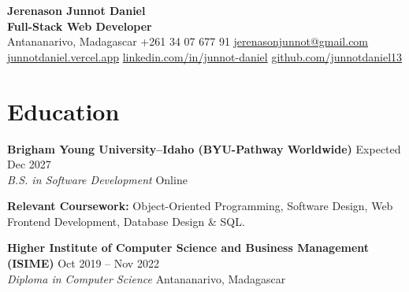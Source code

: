 \documentclass[10pt,a4paper]{article}
\newcommand{\entry}[4]{%
  {\bfseries #1} \hfill {\color{muted}#2}\\
  {\color{accent}\itshape #3} \hfill {\color{muted}\small #4}\par
  \vspace{1pt}}
\newcommand{\sep}{\hspace{4pt}{\color{muted}|}\hspace{4pt}}
\begin{document}
\vspace*{-6pt}
\begin{center}
  {\fontsize{22}{26}\selectfont\bfseries\color{accent}
    Jerenason Junnot Daniel}\\[3pt]
  {\large\bfseries\color{muted} Full-Stack Web Developer}\\[4pt]
  {\small
    Antananarivo, Madagascar\sep
    +261 34 07 677 91\sep
    \href{mailto:jerenasonjunnot@gmail.com}{jerenasonjunnot@gmail.com}\\[2pt]
    \href{https://junnotdaniel.vercel.app}{junnotdaniel.vercel.app}\sep
    \href{https://www.linkedin.com/in/junnot-daniel}{linkedin.com/in/junnot-daniel}\sep
    \href{https://github.com/junnotdaniel13}{github.com/junnotdaniel13}}
\end{center}
\vspace{-6pt}

\vfill


\section*{Education}
\entry{Brigham Young University--Idaho (BYU-Pathway Worldwide)}{Expected Dec 2027}%
{B.S. in Software Development}{Online}
{\small\color{muted}\textbf{Relevant Coursework:} Object-Oriented
Programming, Software Design, Web Frontend Development, Database Design \&
SQL.}\par
\vspace{5pt}

\entry{Higher Institute of Computer Science and Business Management (ISIME)}%
{Oct 2019 -- Nov 2022}{Diploma in Computer Science}{Antananarivo, Madagascar}

\vfill
\end{document}
